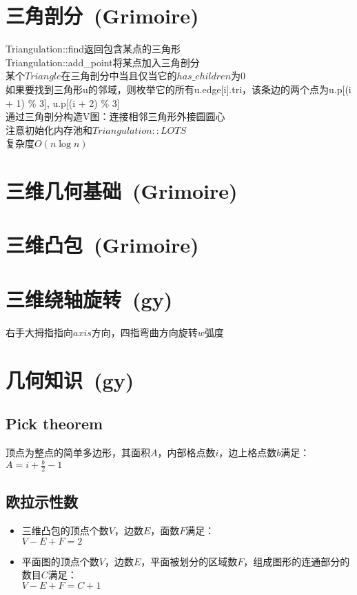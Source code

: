 \section{三角剖分\ \small(Grimoire)}
	Triangulation::find返回包含某点的三角形
	\\Triangulation::add\_point将某点加入三角剖分
	\\某个$ Triangle $在三角剖分中当且仅当它的$ has\_children $为$ 0 $
	\\如果要找到三角形u的邻域，则枚举它的所有u.edge[i].tri，该条边的两个点为u.p[(i + 1) \% 3], u.p[(i + 2) \% 3]
	\\通过三角剖分构造V图：连接相邻三角形外接圆圆心
	\\注意初始化内存池和$ Triangulation::LOTS $
	\\复杂度$ O(n \log n) $
\section{三维几何基础\ \small(Grimoire)}
\section{三维凸包\ \small(Grimoire)}
\section{三维绕轴旋转\ \small(gy)}
	右手大拇指指向$ axis $方向，四指弯曲方向旋转$ w $弧度
\section{几何知识\ \small(gy)}
	\subsection*{Pick theorem}
		顶点为整点的简单多边形，其面积$ A $，内部格点数$ i $，边上格点数$ b $满足：
		\\$ A = i + \frac{b}{2} - 1 $
	\subsection*{欧拉示性数}
		\begin{itemize}[nosep,wide=0pt]
			\item 三维凸包的顶点个数$ V $，边数$ E $，面数$ F $满足：
			\\$ V - E + F = 2 $
			\item 平面图的顶点个数$ V $，边数$ E $，平面被划分的区域数$ F $，组成图形的连通部分的数目$ C $满足：
			\\$ V - E + F = C + 1 $
		\end{itemize}
